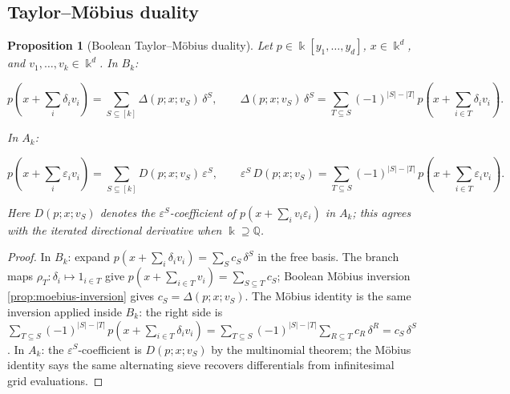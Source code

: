 \documentclass[10pt,a4paper]{article}
\theoremstyle{plain}
\newtheorem{proposition}[theorem]{Proposition}
\theoremstyle{definition}
\newcommand{\IQ}{\mathbb{Q}} %
\newcommand{\ik}{\Bbbk} %
\newcommand{\1}{\mathbb{1}} %
\newcommand{\eps}{\varepsilon} %
\begin{document}
\subsection{Taylor--Möbius duality}\label{taylormuxf6bius-duality}

\begin{proposition}[Boolean Taylor--Möbius duality]

\label{prop:poly-taylor-duality} Let \(p \in \ik[y_1, \dots, y_d]\),
\(x \in \ik^d\), and \(v_1, \dots, v_k \in \ik^d\). In \(B_k\):

\[
  p(x + {\textstyle\sum_i} \delta_i v_i) = \sum_{S \subseteq [k]} \Delta(p; x; v_S)\, \delta^S, \qquad \Delta(p; x; v_S)\, \delta^S = \sum_{T \subseteq S} (-1)^{|S|-|T|}\, p(x + {\textstyle\sum_{i \in T}} \delta_i v_i).
\]

In \(A_k\):

\[
  p(x + {\textstyle\sum_i} \eps_i v_i) = \sum_{S \subseteq [k]} D(p; x; v_S)\, \eps^S, \qquad \eps^S\, D(p; x; v_S) = \sum_{T \subseteq S} (-1)^{|S|-|T|}\, p(x + {\textstyle\sum_{i \in T}} \eps_i v_i).
\]

Here \(D(p; x; v_S)\) denotes the \(\eps^S\)-coefficient of
\(p(x + \sum_i v_i \eps_i)\) in \(A_k\); this agrees with the iterated
directional derivative when \(\ik \supseteq \IQ\).

\end{proposition}

\begin{proof}

In \(B_k\): expand
\(p(x + \sum_i \delta_i v_i) = \sum_S c_S\, \delta^S\) in the free
basis. The branch maps \(\rho_T: \delta_i \mapsto 1_{i \in T}\) give
\(p(x + \sum_{i \in T} v_i) = \sum_{S \subseteq T} c_S\); Boolean Möbius
inversion \ref{prop:moebius-inversion} gives
\(c_S = \Delta(p; x; v_S)\). The Möbius identity is the same inversion
applied inside \(B_k\): the right side is
\(\sum_{T \subseteq S} (-1)^{|S|-|T|}\, p(x + \sum_{i \in T} \delta_i v_i) = \sum_{T \subseteq S} (-1)^{|S|-|T|} \sum_{R \subseteq T} c_R\, \delta^R = c_S\, \delta^S\).
In \(A_k\): the \(\eps^S\)-coefficient is \(D(p; x; v_S)\) by the
multinomial theorem; the Möbius identity says the same alternating sieve
recovers differentials from infinitesimal grid evaluations.

\end{proof}
\end{document}
